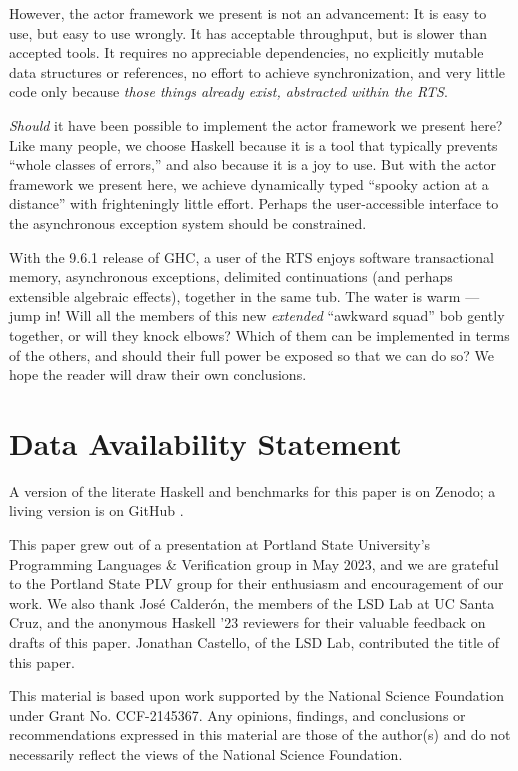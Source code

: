 \documentclass[sigplan,screen]{acmart}
\begin{document}
However, the actor framework we present is not an advancement:
%
It is easy to use, but easy to use wrongly.
%
It has acceptable throughput, but is slower than accepted
tools.
%
It requires no appreciable dependencies, no explicitly mutable data structures
or references, no effort to achieve synchronization, and very little code only
because \emph{those things already exist, abstracted within the RTS}.


\emph{Should} it have been possible to implement the actor framework we present
here?
%
Like many people, we choose Haskell because it is a tool that typically
prevents ``whole classes of errors,'' and also because it is a joy to use.
%
But with the actor framework we present here,
we achieve dynamically typed ``spooky action at a distance''
with frighteningly little effort.
%
Perhaps the user-accessible interface to the asynchronous exception system
should be constrained.

With the 9.6.1 release of GHC,
a user of the RTS enjoys
software transactional memory,
asynchronous exceptions,
delimited continuations (and perhaps extensible algebraic effects),
together in the same tub.
%
The water is warm --- jump in!
%
Will all the members of this new \emph{extended} ``awkward squad''
\cite{peytonjones2001tackling} bob gently together, or will they knock elbows?
%
Which of them can be implemented in terms of the
others, and should their full power be exposed so that we can do so?
%
We hope the reader will draw their own conclusions.






\section*{Data Availability Statement}

A version of the literate Haskell and benchmarks for this paper
is on Zenodo; a living version is on GitHub \cite{hakkellartifact}.




\begin{acks}
This paper grew out of a presentation at Portland State University's Programming Languages \& Verification group in May 2023, and we are grateful to the Portland State PLV group for their enthusiasm and encouragement of our work.
%
We also thank Jos\'{e} Calder\'{o}n, the members of the LSD Lab at UC Santa Cruz, and the anonymous Haskell '23 reviewers for their valuable feedback on drafts of this paper.
Jonathan Castello, of the LSD Lab, contributed the title of this paper.

This material is based upon work supported by the National Science Foundation under Grant No. CCF-2145367. Any opinions, findings, and conclusions or recommendations expressed in this material are those of the author(s) and do not necessarily reflect the views of the National Science Foundation.
\end{acks}
\end{document}
